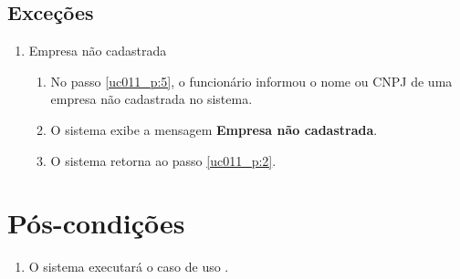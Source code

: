 \subsection{Exceções}

\begin{enumerate}[label=E\arabic*]
	\item Empresa não cadastrada \label{uc011_e:1}
	\begin{enumerate}[label*=.\arabic*]
		\item[] No passo \ref{uc011_p:5}, o funcionário informou o nome ou CNPJ de uma empresa não cadastrada no sistema.
		\item O sistema exibe a mensagem \textbf{Empresa não cadastrada}.
		\item O sistema retorna ao passo \ref{uc011_p:2}.
	\end{enumerate}
\end{enumerate}

\section{Pós-condições}

\begin{enumerate}
	\item O sistema executará o caso de uso .	
\end{enumerate}